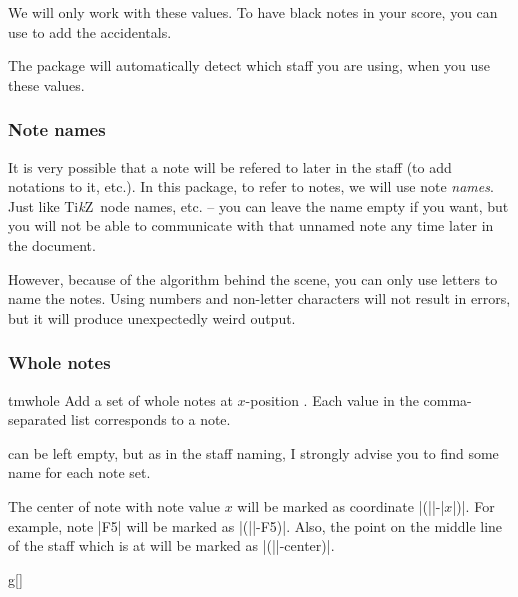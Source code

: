\documentclass[11pt,a4paper]{ltxdoc}
\newcommand\tikzname{Ti\emph{k}Z}
\begin{document}
We will only work with these values. To have black notes in your score, you can 
use  to add the accidentals.

The package will automatically detect which staff you are using, when you use 
these values.
\subsubsection{Note names}\label{sec:music-notes:commands:note-names}
It is very possible that a note will be refered to later in the staff (to add 
notations to it, etc.). In this package, to refer to notes, we will use note 
\emph{names}. Just like \tikzname\ node names, etc. -- you can leave the name 
empty if you want, but you will not be able to communicate with that unnamed note 
any time later in the document.

However, because of the algorithm behind the scene, you can only use letters to 
name the notes. Using numbers and non-letter characters will not result in errors, 
but it will produce unexpectedly weird output.
\subsubsection{Whole notes}\label{sec:music-notes:commands:whole}
\begin{docCommand}{tmwhole}{}
  Add a set of whole notes at $x$-position . Each value in the 
  comma-separated list  corresponds to a note.

   can be left empty, but as in the staff naming, I strongly advise 
  you to find some name for each note set.

  The center of note with note value $x$ will be marked as coordinate 
  |(||-|$x$|)|. For example, note |F5| will be marked as 
  |(||-F5)|. Also, the point on the middle line of the staff which is 
  at  will be marked as |(||-center)|.
\end{docCommand}
\begin{dispExample}
\begin{tmsinglestaff}
  \begin{tmstaff}{g}[]
  \end{tmstaff}
\end{tmsinglestaff}
\end{dispExample}
\end{document}

